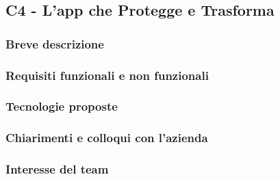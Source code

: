 \documentclass[a4paper,11pt]{article}
\begin{document}
\subsection{C4 - L'app che Protegge e Trasforma}
\subsubsection{Breve descrizione}
\subsubsection{Requisiti funzionali e non funzionali}
\subsubsection{Tecnologie proposte}
\subsubsection{Chiarimenti e colloqui con l'azienda}
\subsubsection{Interesse del team}
\end{document}
